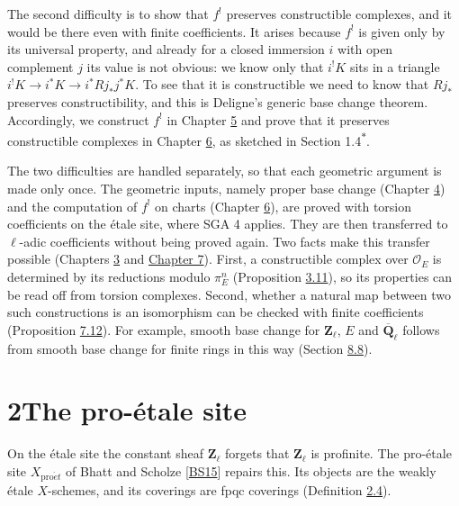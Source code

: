 \documentclass[11pt]{article}
\newcommand{\bpout}[1]{#1\textsuperscript{\hyperlink{bp-outside}{\ensuremath{\ast}}}}
\begin{document}
The second difficulty is to show that \(f^!\) preserves constructible complexes, and it would be there even with finite coefficients. It arises because \(f^!\) is given only by its universal property, and already for a closed immersion \(i\) with open complement \(j\) its value is not obvious: we know only that \(i^!K\) sits in a triangle \(i^!K\to i^*K\to i^*Rj_*j^*K\). To see that it is constructible we need to know that \(Rj_*\) preserves constructibility, and this is Deligne's generic base change theorem. Accordingly, we construct \(f^!\) in Chapter \hyperref[bp407]{5} and prove that it preserves constructible complexes in Chapter \hyperref[bp513]{6}, as sketched in Section \bpout{1.4}.

The two difficulties are handled separately, so that each geometric argument is made only once. The geometric inputs, namely proper base change (Chapter \hyperref[bp285]{4}) and the computation of \(f^!\) on charts (Chapter \hyperref[bp513]{6}), are proved with torsion coefficients on the étale site, where SGA 4 applies. They are then transferred to \(\ell\)-adic coefficients without being proved again. Two facts make this transfer possible (Chapters \hyperref[bp193]{3} and \hyperref[bp601]{Chapter 7}). First, a constructible complex over \(\mathcal O_E\) is determined by its reductions modulo \(\pi_E^n\) (Proposition \hyperref[bp226]{3.11}), so its properties can be read off from torsion complexes. Second, whether a natural map between two such constructions is an isomorphism can be checked with finite coefficients (Proposition \hyperref[bp634]{7.12}). For example, smooth base change for \(\mathbf Z_\ell\), \(E\) and \(\overline{\mathbf Q}_\ell\) follows from smooth base change for finite rings in this way (Section \hyperref[bp677]{8.8}).

\section*{\texorpdfstring{2\quad The pro-étale site}{2 The pro-étale site}}
\label{bp3}%
\label{bp4}%
On the étale site the constant sheaf \(\mathbf Z_\ell\) forgets that \(\mathbf Z_\ell\) is profinite. The pro-étale site \(X_{\mathrm{pro}\acute{e}t}\) of Bhatt and Scholze [\hyperref[bp705]{BS15}] repairs this. Its objects are the weakly étale \(X\)-schemes, and its coverings are fpqc coverings (Definition \hyperref[bp14]{2.4}).
\end{document}

